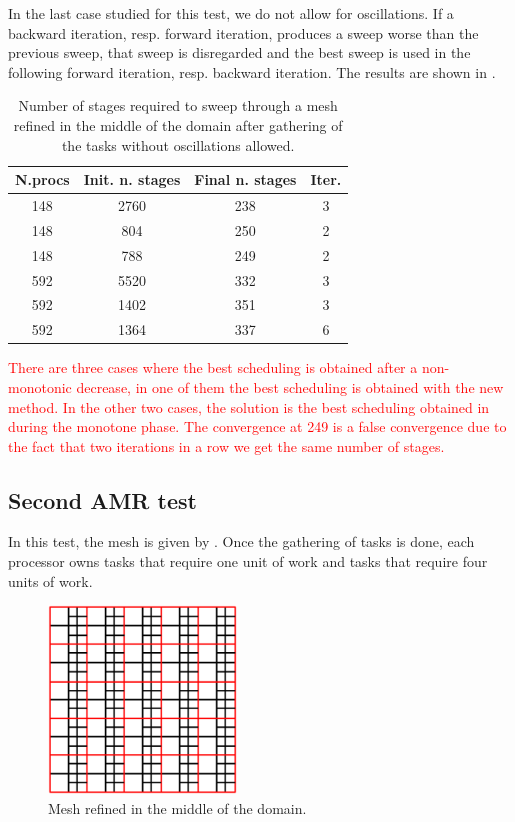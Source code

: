 \documentclass[letterpaper]{article}
\newcommand\red{\textcolor{red}}
\renewcommand{\(}{\left(}
\renewcommand{\)}{\right)}
\renewcommand{\[}{\left[}
\renewcommand{\]}{\right]}
\begin{document}
In the last case studied for this test, we do not allow for oscillations. If a
backward iteration, resp. forward iteration, produces a sweep worse than the
previous sweep, that sweep is disregarded and the best sweep is used in the
following forward iteration, resp. backward iteration. The results are shown in 
.
\begin{table}[H]
  \begin{center}
    \begin{tabular}{|c|c|c|c|}
      \hline
      N.procs & Init. n. stages & Final n. stages & Iter. \\
      \hline
      148 & 2760 & 238 & 3 \\
      148 & 804  & 250 & 2 \\
      148 & 788  & 249 & 2 \\
      592 & 5520 & 332 & 3 \\
      592 & 1402 & 351 & 3 \\
      592 & 1364 & 337 & 6 \\
      \hline
    \end{tabular}
    \caption{Number of stages required to sweep through a mesh refined in the
      middle of the domain after gathering of the tasks without oscillations
    allowed.}
    \label{amr_3}
  \end{center}
\end{table}
\red{There are three cases where the best scheduling is obtained after a
non-monotonic decrease, in one of them the best scheduling is obtained with the
new method. In the other two cases, the solution is the best scheduling obtained
in during the monotone phase. The convergence at 249 is a false convergence due
to the fact that two iterations in a row we get the same number of stages.}


\subsection{Second AMR test}
In this test, the mesh is given by . Once the gathering of tasks is
done, each processor owns tasks that require one unit of work and tasks that
require four units of work.
\begin{figure}[H]
  \centering
  \includegraphics[width=5cm]{mesh_2}
  \caption{Mesh refined in the middle of the domain.}
  \label{mesh_2}
\end{figure}
\end{document}
